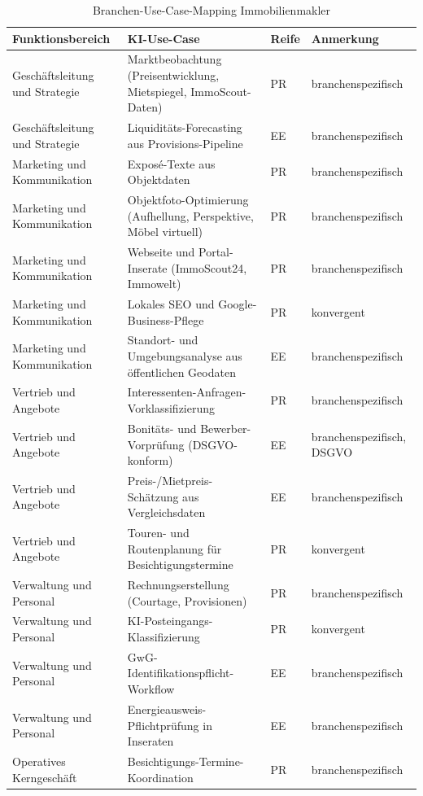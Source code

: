 \documentclass[a4paper,11pt]{article}
\begin{document}
\begin{table}[H]
\centering
\caption{Branchen-Use-Case-Mapping Immobilienmakler}
\label{tab:mapping-makler}
\small
\begin{tabular}{p{3.3cm}p{7.3cm}p{1cm}p{2.5cm}}
\toprule
\textbf{Funktionsbereich} & \textbf{KI-Use-Case} & \textbf{Reife} & \textbf{Anmerkung} \\
\midrule
Geschäftsleitung und Strategie & Marktbeobachtung (Preisentwicklung, Mietspiegel, ImmoScout-Daten) & PR & branchenspezifisch \\
Geschäftsleitung und Strategie & Liquiditäts-Forecasting aus Provisions-Pipeline & EE & branchenspezifisch \\
Marketing und Kommunikation & Exposé-Texte aus Objektdaten & PR & branchenspezifisch \\
Marketing und Kommunikation & Objektfoto-Optimierung (Aufhellung, Perspektive, Möbel virtuell) & PR & branchenspezifisch \\
Marketing und Kommunikation & Webseite und Portal-Inserate (ImmoScout24, Immowelt) & PR & branchenspezifisch \\
Marketing und Kommunikation & Lokales SEO und Google-Business-Pflege & PR & konvergent \\
Marketing und Kommunikation & Standort- und Umgebungsanalyse aus öffentlichen Geodaten & EE & branchenspezifisch \\
Vertrieb und Angebote & Interessenten-Anfragen-Vorklassifizierung & PR & branchenspezifisch \\
Vertrieb und Angebote & Bonitäts- und Bewerber-Vorprüfung (DSGVO-konform) & EE & branchenspezifisch, DSGVO \\
Vertrieb und Angebote & Preis-/Mietpreis-Schätzung aus Vergleichsdaten & EE & branchenspezifisch \\
Vertrieb und Angebote & Touren- und Routenplanung für Besichtigungstermine & PR & konvergent \\
Verwaltung und Personal & Rechnungserstellung (Courtage, Provisionen) & PR & branchenspezifisch \\
Verwaltung und Personal & KI-Posteingangs-Klassifizierung & PR & konvergent \\
Verwaltung und Personal & GwG-Identifikationspflicht-Workflow & EE & branchenspezifisch \\
Verwaltung und Personal & Energieausweis-Pflichtprüfung in Inseraten & EE & branchenspezifisch \\
Operatives Kerngeschäft & Besichtigungs-Termine-Koordination & PR & branchenspezifisch \\

\end{tabular}
\end{table}
\end{document}

